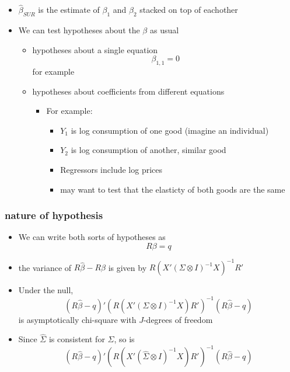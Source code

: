 \documentclass[11pt]{article}
\begin{document}
\begin{itemize}
\item $\hat\beta_{SUR}$ is the estimate of $\beta_1$ and $\beta_2$
        stacked on top of eachother
\item We can test hypotheses about the $\beta$ as usual
\begin{itemize}
\item hypotheses about a single equation
          \[ \beta_{1,1} = 0 \]
          for example
\item hypotheses about coefficients from different equations
\begin{itemize}
\item For example:
\begin{itemize}
\item $Y_1$ is log consumption of one good (imagine an individual)
\item $Y_2$ is log consumption of another, similar good
\item Regressors include log prices
\item may want to test that the elasticty of both goods are
              the same
\end{itemize}
\end{itemize}
\end{itemize}
\end{itemize}
\subsubsection{nature of hypothesis}
\label{sec-2-6-2}

\begin{itemize}
\item We can write both sorts of hypotheses as
        \[ R \beta = q \]
\item the variance of $R\hat\beta - R\beta$ is given by $R(X'(\Sigma
        \otimes I)^{-1}X)^{-1}R'$
\item Under the null, 
        \[(R\hat\beta - q)'\left(R(X'(\Sigma \otimes
        I)^{-1}X)R'\right)^{-1}(R\hat\beta - q)\] is asymptotically
        chi-square with $J$-degrees of freedom
\item Since $\hat\Sigma$ is consistent for $\Sigma$, so is
        \[(R\hat\beta - q)'\left(R(X'(\hat\Sigma \otimes
        I)^{-1}X)R'\right)^{-1}(R\hat\beta - q)\]
\end{itemize}
\end{document}
